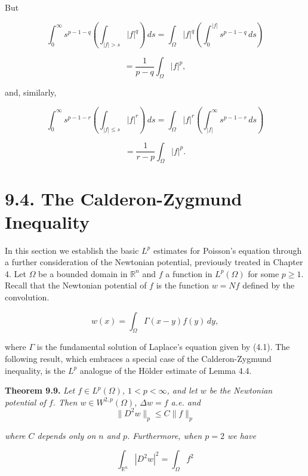 But

\[
\int_0^{\infty} s^{p-1-q}\left(\int_{|f|>s} |f|^q\right)\,ds
= \int_{\Omega} |f|^q \left(\int_0^{|f|} s^{p-1-q}\,ds\right)
\]

\[
= \frac{1}{p-q}\int_{\Omega} |f|^p,
\]

and, similarly,

\[
\int_0^{\infty} s^{p-1-r}\left(\int_{|f|\leq s} |f|^r\right)\,ds
= \int_{\Omega} |f|^r \left(\int_{|f|}^{\infty} s^{p-1-r}\,ds\right)
\]

\[
= \frac{1}{r-p}\int_{\Omega} |f|^p.
\]

\section*{9.4. The Calderon-Zygmund Inequality}

In this section we establish the basic $L^p$ estimates for Poisson's equation through a
further consideration of the Newtonian potential, previously treated in Chapter 4.
Let $\Omega$ be a bounded domain in $\mathbb{R}^n$ and $f$ a function in $L^p(\Omega)$ for some $p \ge 1$. Recall
that the Newtonian potential of $f$ is the function $w = Nf$ defined by the convolution.

\begin{equation}
\tag{9.26}
w(x)=\int_{\Omega}\Gamma(x-y)f(y)\,dy,
\end{equation}

where $\Gamma$ is the fundamental solution of Laplace's equation given by (4.1). The
following result, which embraces a special case of the Calderon-Zygmund inequality, is the $L^p$ analogue of the Hölder estimate of Lemma 4.4.

\textbf{Theorem 9.9.}
\emph{Let $f \in L^p(\Omega)$, $1 < p < \infty$, and let $w$ be the Newtonian potential of $f$.
Then $w \in W^{2,p}(\Omega)$, $\Delta w = f$ a.e. and}
\begin{equation}
\tag{9.27}
\|D^2w\|_p \le C\|f\|_p
\end{equation}

\emph{where $C$ depends only on $n$ and $p$. Furthermore, when $p = 2$ we have}

\begin{equation}
\tag{9.28}
\int_{\mathbb{R}^n}\!|D^2w|^2=\int_{\Omega}\!f^2
\end{equation}


\pagestyle{empty}


